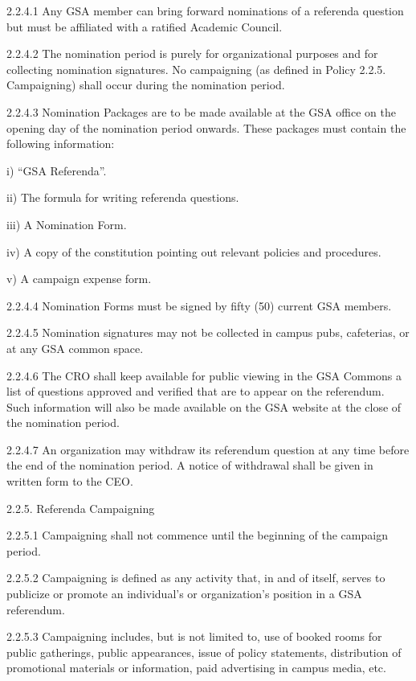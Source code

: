  2.2.4.1 Any GSA member can bring forward nominations of a referenda 
 question but must be affiliated with a ratified Academic Council. 
 
 2.2.4.2 The nomination period is purely for organizational purposes and 
 for collecting nomination signatures. No campaigning (as defined in Policy 2.2.5. Campaigning) shall occur during the nomination 
 period. 
 
 2.2.4.3 Nomination Packages are to be made available at the GSA office 
 on the opening day of the nomination period onwards. These 
 packages must contain the following information: 
 
 i) “GSA Referenda”. 
 
 ii) The formula for writing referenda questions. 
 
 iii) A Nomination Form. 
 
 iv) A copy of the constitution pointing out relevant policies 
 and procedures. 
 
 v) A campaign expense form. 
 
 2.2.4.4 Nomination Forms must be signed by fifty (50) current GSA 
 members. 
 
 2.2.4.5 Nomination signatures may not be collected in campus pubs, 
 cafeterias, or at any GSA common space. 
 
 2.2.4.6 The CRO shall keep available for public viewing in the GSA 
 Commons a list of questions approved and verified that are to 
 appear on the referendum. Such information will also be made 
 available on the GSA website at the close of the nomination 
 period. 
 
 2.2.4.7 An organization may withdraw its referendum question at any 
 time before the end of the nomination period. A notice of 
 withdrawal shall be given in written form to the CEO. 
 
 2.2.5. Referenda Campaigning 
 
 2.2.5.1 Campaigning shall not commence until the beginning of the 
 campaign period. 
 
 2.2.5.2 Campaigning is defined as any activity that, in and of itself, serves to publicize or promote an individual’s or 
 organization’s position in a GSA referendum. 
 
 2.2.5.3 Campaigning includes, but is not limited to, use of booked rooms 
 for public gatherings, public appearances, issue of policy 
 statements, distribution of promotional materials or information, 
 paid advertising in campus media, etc. 
 
